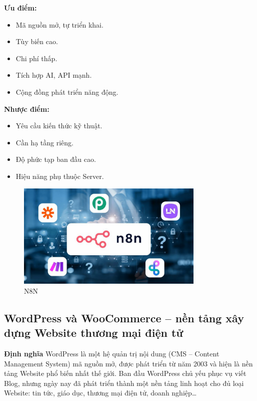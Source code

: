 \textbf{Ưu điểm:}
\begin{itemize}
    \item Mã nguồn mở, tự triển khai.
    \item Tùy biến cao.
    \item Chi phí thấp.
    \item Tích hợp AI, API mạnh.
    \item Cộng đồng phát triển năng động.
\end{itemize}

\textbf{Nhược điểm:}
\begin{itemize}
    \item Yêu cầu kiến thức kỹ thuật.
    \item Cần hạ tầng riêng.
    \item Độ phức tạp ban đầu cao.
    \item Hiệu năng phụ thuộc Server.
\end{itemize}

\begin{figure}
\centering
    \includegraphics[width=0.8\textwidth]{img/Picture5.png}

    \caption{ N8N}
    \label{fig:n8n}
\end{figure}


\subsection{WordPress và WooCommerce – nền tảng xây dựng Website thương mại điện tử}

\textbf{Định nghĩa}
WordPress là một hệ quản trị nội dung (CMS – Content Management System) mã nguồn mở, được phát triển từ năm 2003 và hiện là nền tảng Website phổ biến nhất thế giới. Ban đầu WordPress chủ yếu phục vụ viết Blog, nhưng ngày nay đã phát triển thành một nền tảng linh hoạt cho đủ loại Website: tin tức, giáo dục, thương mại điện tử, doanh nghiệp\dots

